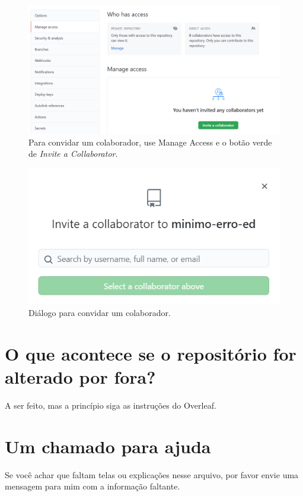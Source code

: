 \documentclass{article}
\begin{document}
\begin{figure}[hbt]
    \centering
    \includegraphics[width=0.9\linewidth]{Image010.png}
    \caption{Para convidar um colaborador, use Manage Access e o botão verde de \textit{Invite a Collaborator}.}
    \label{fig:colinv1}
\end{figure}

\begin{figure}[hbt]
    \centering
    \includegraphics[width=0.9\linewidth]{Image011.png}
    \caption{Diálogo para convidar um colaborador.}
    \label{fig:collab}
\end{figure}

\section{O que acontece se o repositório for alterado por fora?}

A ser feito, mas a princípio siga as instruções do Overleaf.

\section{Um chamado para ajuda}

Se você achar que faltam telas ou explicações nesse arquivo, por favor envie uma mensagem para mim com a informação faltante.
\end{document}
